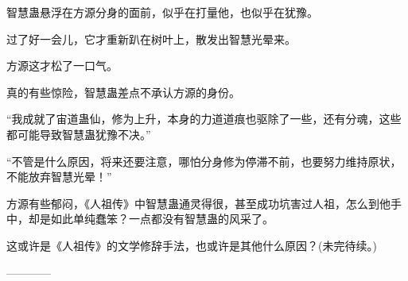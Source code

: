 \begin{this_body}
智慧蛊悬浮在方源分身的面前，似乎在打量他，也似乎在犹豫。

过了好一会儿，它才重新趴在树叶上，散发出智慧光晕来。

方源这才松了一口气。

真的有些惊险，智慧蛊差点不承认方源的身份。

“我成就了宙道蛊仙，修为上升，本身的力道道痕也驱除了一些，还有分魂，这些都可能导致智慧蛊犹豫不决。”

“不管是什么原因，将来还要注意，哪怕分身修为停滞不前，也要努力维持原状，不能放弃智慧光晕！”

方源有些郁闷，《人祖传》中智慧蛊通灵得很，甚至成功坑害过人祖，怎么到他手中，却是如此单纯蠢笨？一点都没有智慧蛊的风采了。

这或许是《人祖传》的文学修辞手法，也或许是其他什么原因？(未完待续。)

------------

\end{this_body}

